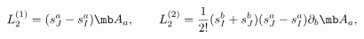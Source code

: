 \begin{equation}
L^{(1)}_{2}=(s^{a}_{J}-s^{a}_{I}){\mb A}_{a}, \qquad
L^{(2)}_{2}=\frac{1}{2!}(s^{b}_{I}+s^{b}_{J})(s^{a}_{J}-s^{a}_{I})\partial_{b}{\mb A}_{a}, \quad
\end{equation}

